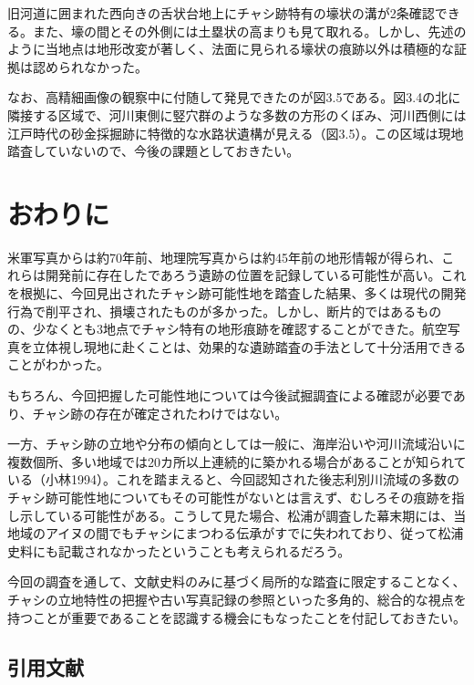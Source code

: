 \documentclass[a4j,11pt,twocolumn,openany]{jsbook}
\begin{document}
旧河道に囲まれた西向きの舌状台地上にチャシ跡特有の壕状の溝が2条確認できる。また、壕の間とその外側には土塁状の高まりも見て取れる。しかし、先述のように当地点は地形改変が著しく、法面に見られる壕状の痕跡以外は積極的な証拠は認められなかった。

なお、高精細画像の観察中に付随して発見できたのが図3.5である。図3.4の北に隣接する区域で、河川東側に竪穴群のような多数の方形のくぼみ、河川西側には江戸時代の砂金採掘跡に特徴的な水路状遺構が見える（図3.5）。この区域は現地踏査していないので、今後の課題としておきたい。

\section{おわりに}

米軍写真からは約70年前、地理院写真からは約45年前の地形情報が得られ、これらは開発前に存在したであろう遺跡の位置を記録している可能性が高い。これを根拠に、今回見出されたチャシ跡可能性地を踏査した結果、多くは現代の開発行為で削平され、損壊されたものが多かった。しかし、断片的ではあるものの、少なくとも3地点でチャシ特有の地形痕跡を確認することができた。航空写真を立体視し現地に赴くことは、効果的な遺跡踏査の手法として十分活用できることがわかった。

もちろん、今回把握した可能性地については今後試掘調査による確認が必要であり、チャシ跡の存在が確定されたわけではない。

一方、チャシ跡の立地や分布の傾向としては一般に、海岸沿いや河川流域沿いに複数個所、多い地域では20カ所以上連続的に築かれる場合があることが知られている（小林1994）。これを踏まえると、今回認知された後志利別川流域の多数のチャシ跡可能性地についてもその可能性がないとは言えず、むしろその痕跡を指し示している可能性がある。こうして見た場合、松浦が調査した幕末期には、当地域のアイヌの間でもチャシにまつわる伝承がすでに失われており、従って松浦史料にも記載されなかったということも考えられるだろう。

今回の調査を通して、文献史料のみに基づく局所的な踏査に限定することなく、チャシの立地特性の把握や古い写真記録の参照といった多角的、総合的な視点を持つことが重要であることを認識する機会にもなったことを付記しておきたい。
\vspace{1\baselineskip}

\subsection*{引用文献}
\end{document}
